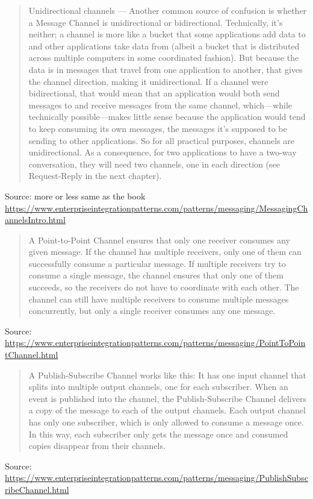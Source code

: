 \documentclass[Screen16to9,17pt]{foils}
\begin{document}


\begin{quote}\small
Unidirectional channels — Another common source of confusion is whether a Message Channel is unidirectional or bidirectional. Technically, it’s neither; a channel is more like a bucket that some applications add data to and other applications take data from (albeit a bucket that is distributed across multiple computers in some coordinated fashion). But because the data is in messages that travel from one application to another, that gives the channel direction, making it unidirectional. If a channel were bidirectional, that would mean that an application would both send messages to and receive messages from the same channel, which—while technically possible—makes little sense because the application would tend to keep consuming its own messages, the messages it’s supposed to be sending to other applications. So for all practical purposes, channels are unidirectional. As a consequence, for two applications to have a two-way conversation, they will need two channels, one in each direction (see Request-Reply in the next chapter).
\end{quote}
Source:  more or less same as the book\\{\footnotesize \url{https://www.enterpriseintegrationpatterns.com/patterns/messaging/MessagingChannelsIntro.html}}




\begin{quote}\footnotesize
A Point-to-Point Channel ensures that only one receiver consumes any given message. If the channel has multiple receivers, only one of them can successfully consume a particular message. If multiple receivers try to consume a single message, the channel ensures that only one of them succeeds, so the receivers do not have to coordinate with each other. The channel can still have multiple receivers to consume multiple messages concurrently, but only a single receiver consumes any one message.
\end{quote}
Source: \url{https://www.enterpriseintegrationpatterns.com/patterns/messaging/PointToPointChannel.html}




\begin{quote}\footnotesize
A Publish-Subscribe Channel works like this: It has one input channel that splits into multiple output channels, one for each subscriber. When an event is published into the channel, the Publish-Subscribe Channel delivers a copy of the message to each of the output channels. Each output channel has only one subscriber, which is only allowed to consume a message once. In this way, each subscriber only gets the message once and consumed copies disappear from their channels.
\end{quote}
Source: \url{https://www.enterpriseintegrationpatterns.com/patterns/messaging/PublishSubscribeChannel.html}
\end{document}
